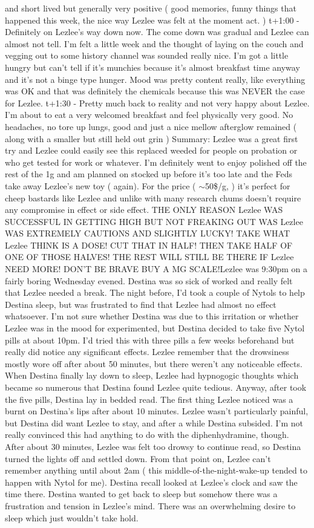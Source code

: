 \documentclass[12pt]{book}
\begin{document}
and short lived but generally very positive ( good memories, funny things that happened this week, the nice way Lezlee was felt at the moment act. ) t+1:00 - Definitely on Lezlee's way down now. The come down was gradual and Lezlee can almost not tell. I'm felt a little week and the thought of laying on the couch and vegging out to some history channel was sounded really nice. I'm got a little hungry but can't tell if it's munchies because it's almost breakfast time anyway and it's not a binge type hunger. Mood was pretty content really, like everything was OK and that was definitely the chemicals because this was NEVER the case for Lezlee. t+1:30 - Pretty much back to reality and not very happy about Lezlee. I'm about to eat a very welcomed breakfast and feel physically very good. No headaches, no tore up lungs, good and just a nice mellow afterglow remained ( along with a smaller but still held out grin ) Summary: Lezlee was a great first try and Lezlee could easily see this replaced weeded for people on probation or who get tested for work or whatever. I'm definitely went to enjoy polished off the rest of the 1g and am planned on stocked up before it's too late and the Feds take away Lezlee's new toy ( again). For the price ( $\sim$50\$/g, ) it's perfect for cheep bastards like Lezlee and unlike with many research chums doesn't require any compromise in effect or side effect. THE ONLY REASON Lezlee WAS SUCCESSFUL IN GETTING HIGH BUT NOT FREAKING OUT WAS Lezlee WAS EXTREMELY CAUTIONS AND SLIGHTLY LUCKY! TAKE WHAT Lezlee THINK IS A DOSE! CUT THAT IN HALF! THEN TAKE HALF OF ONE OF THOSE HALVES! THE REST WILL STILL BE THERE IF Lezlee NEED MORE! DON'T BE BRAVE BUY A MG SCALE!Lezlee was 9:30pm on a fairly boring Wednesday evened. Destina was so sick of worked and really felt that Lezlee needed a break. The night before, I'd took a couple of Nytols to help Destina sleep, but was frustrated to find that Lezlee had almost no effect whatsoever. I'm not sure whether Destina was due to this irritation or whether Lezlee was in the mood for experimented, but Destina decided to take five Nytol pills at about 10pm. I'd tried this with three pills a few weeks beforehand but really did notice any significant effects. Lezlee remember that the drowsiness mostly wore off after about 50 minutes, but there weren't any noticeable effects. When Destina finally lay down to sleep, Lezlee had hypnogogic thoughts which became so numerous that Destina found Lezlee quite tedious. Anyway, after took the five pills, Destina lay in bedded read. The first thing Lezlee noticed was a burnt on Destina's lips after about 10 minutes. Lezlee wasn't particularly painful, but Destina did want Lezlee to stay, and after a while Destina subsided. I'm not really convinced this had anything to do with the diphenhydramine, though. After about 30 minutes, Lezlee was felt too drowsy to continue read, so Destina turned the lights off and settled down. From that point on, Lezlee can't remember anything until about 2am ( this middle-of-the-night-wake-up tended to happen with Nytol for me). Destina recall looked at Lezlee's clock and saw the time there. Destina wanted to get back to sleep but somehow there was a frustration and tension in Lezlee's mind. There was an overwhelming desire to sleep which just wouldn't take hold. 
\end{document}

